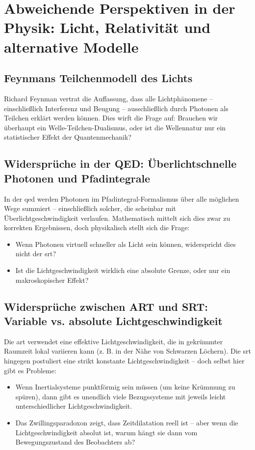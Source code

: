 \section{Abweichende Perspektiven in der Physik: Licht, Relativität und alternative Modelle}
\subsection{Feynmans Teilchenmodell des Lichts}
Richard Feynman vertrat die Auffassung, dass alle Lichtphänomene – einschließlich Interferenz und Beugung – ausschließlich durch Photonen als Teilchen erklärt werden können.
Dies wirft die Frage auf: Brauchen wir überhaupt ein Welle-Teilchen-Dualismus, oder ist die Wellennatur nur ein statistischer Effekt der Quantenmechanik?

\subsection{Widersprüche in der QED: Überlichtschnelle Photonen und Pfadintegrale}
In der \gls{qed} werden Photonen im Pfadintegral-Formalismus über alle möglichen Wege summiert – einschließlich solcher, die scheinbar mit Überlichtgeschwindigkeit verlaufen.
Mathematisch mittelt sich dies zwar zu korrekten Ergebnissen, doch physikalisch stellt sich die Frage:

\begin{itemize}
    \item Wenn Photonen virtuell schneller als Licht sein können, widerspricht dies nicht der \gls{srt}?
    \item Ist die Lichtgeschwindigkeit wirklich eine absolute Grenze, oder nur ein makroskopischer Effekt?
\end{itemize}

\subsection{Widersprüche zwischen ART und SRT: Variable vs. absolute Lichtgeschwindigkeit}
Die \gls{art} verwendet eine effektive Lichtgeschwindigkeit, die in gekrümmter Raumzeit lokal variieren kann (z. B. in der Nähe von Schwarzen Löchern).
Die \gls{srt} hingegen postuliert eine strikt konstante Lichtgeschwindigkeit – doch selbst hier gibt es Probleme:

\begin{itemize}
    \item Wenn Inertialsysteme punktförmig sein müssen (um keine Krümmung zu spüren), dann gibt es unendlich viele Bezugssysteme mit jeweils leicht unterschiedlicher
    Lichtgeschwindigkeit.
    \item Das Zwillingsparadoxon zeigt, dass Zeitdilatation reell ist – aber wenn die Lichtgeschwindigkeit absolut ist, warum hängt sie dann vom Bewegungszustand des
    Beobachters ab?
\end{itemize}

